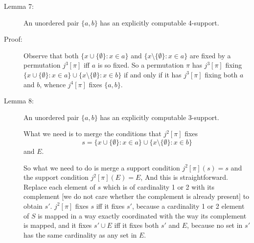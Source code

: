 \documentclass[12pt]{article}
\begin{document}
\begin{description}
\begin{comment}
Observe that if $j^2[\pi]$ fixes $s$, then $\pi$ fixes $c,d,e,f,g,h$.  $\{c\}$ is the only singleton in $s$ so it must be fixed by $j[\pi]$; the pair $\{c,d\}$ must be mapped to a pair containing $c$ by $j[\pi]$, so it must be fixed, so $d$ must be fixed by $\pi$, and we argue similarly that $e,f,g,h$ must be fixed by $\pi$.  Elements $u$ of $a$ have $u \cup \{c,d,e\} \setminus \{f,g,h\}$ sent by $j[\pi]$ to some $u' \cup \{c,d,e\} \setminus \{f,g,h\}$ where $u'$ must be another element of $a$ [because this set will have at least three elements, three of which will be in $\{c,d,e\}$, which rules out its being any of the other kinds of elements of $s$], and it is easy to see that $j[\pi](u)=u'$ as well, so $j^2[\pi](a)=a$ (consider the inverse to see that the mapping here is exact), and the argument that $j^2[\pi](b)=b$ is similar.

This argument proves something we already know, but it gives an exact picture of how supports can be merged using familiar set theoretical operations.  This is related to known technology for producing type level ordered pairs, but we don't need as much precision as is needed for an ordered pair definition.

\end{description}

\end{comment}

\item[Lemma 7:]  An unordered pair $\{a,b\}$ has an explicitly computable 4-support.

\item[Proof:]  Observe that both $\{x \cup \{\emptyset\} :x \in a\}$ and $\{x \setminus \{\emptyset\}:x \in a\}$ are fixed by a permutation $j^3[\pi]$ iff $a$ is so fixed.  So a permutation $\pi$ has $j^3[\pi]$ fixing $\{x \cup \{\emptyset\} :x \in a\} \cup \{x \setminus \{\emptyset\}:x \in b\}$
if and only if it has $j^3[\pi]$ fixing both $a$ and $b$, whence $j^4[\pi]$ fixes $\{a,b\}$.

\item[Lemma 8:]  An unordered pair $\{a,b\}$ has an explicitly computable 3-support.

What we need is to merge the conditions that $j^2[\pi]$ fixes $$s=\{x \cup \{\emptyset\} :x \in a\} \cup \{x \setminus \{\emptyset\}:x \in b\}$$ and $E$.

So what we need to do is merge a support condition $j^2[\pi](s)=s$ and the support condition $j^2[\pi](E)=E$,  And this is straightforward.  Replace each element of $s$ which is of cardinality 1 or 2 with its complement [we do not care whether the complement is already present]  to obtain $s'$.  $j^2[\pi]$ fixes $s$ iff it fixes $s'$, because a cardinality 1 or 2 element of $S$ is mapped in a way exactly coordinated with the way its complement is mapped, and it fixes $s' \cup E$ iff it fixes both $s'$ and $E$, because no set in $s'$ has the same cardinality as any set in $E$.

\end{description}
\end{document}
